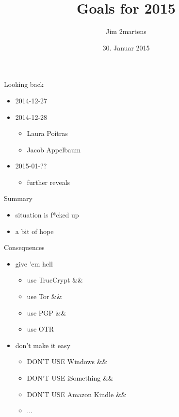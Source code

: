 \documentclass{beamer}
\begin{document}
\author{Jim 2martens}
\title{Goals for 2015}
\date{30. Januar 2015}

	\begin{frame}
		\titlepage
	\end{frame}
	
	\begin{frame}{Looking back}
		\begin{itemize}
			\item 2014-12-27
			\item<2-> 2014-12-28
				\begin{itemize}
					\item Laura Poitras
					\item Jacob Appelbaum
				\end{itemize}
			\item<3-> 2015-01-??
				\begin{itemize}
					\item further reveals
				\end{itemize}
		\end{itemize}
	\end{frame}
	
	\begin{frame}{Summary}
		\begin{itemize}
			\item situation is f*cked up
			\item a bit of hope
		\end{itemize}
	\end{frame}
	
	\begin{frame}{Consequences}
		\begin{itemize}
			\item give 'em hell
			\begin{itemize}
				\item use TrueCrypt \&\&
				\item use Tor \&\&
				\item use PGP \&\&
				\item use OTR				
			\end{itemize}
			\item<2-> don't make it easy
			\begin{itemize}
				\item<3-> DON'T USE Windows \&\&
				\item<4-> DON'T USE iSomething \&\&
				\item<5-> DON'T USE Amazon Kindle \&\&
				\item<6-> ...
			\end{itemize}
		\end{itemize}
	\end{frame}
	
\end{document}
